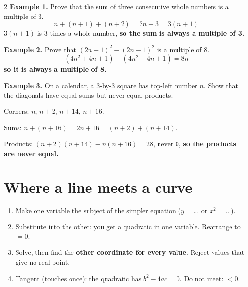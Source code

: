 \documentclass[11pt]{article}
\begin{document}
\begin{multicols}{2}
\textbf{Example 1.} Prove that the sum of three consecutive whole numbers is a multiple of 3.
\[ n + (n+1) + (n+2) = 3n + 3 = 3(n+1) \]
$3(n+1)$ is 3 times a whole number, \textbf{so the sum is always a multiple of 3.} 

\textbf{Example 2.} Prove that $(2n+1)^{2} - (2n-1)^{2}$ is a multiple of 8.
\[ (4n^{2}+4n+1) - (4n^{2}-4n+1) = 8n \]
\textbf{so it is always a multiple of 8.} 
\columnbreak

\textbf{Example 3.} On a calendar, a 3-by-3 square has top-left number $n$. Show that the diagonals have equal sums but never equal products.\par
\par{}\par\smallskip
Corners: $n$, $n+2$, $n+14$, $n+16$.\par
Sums: $n + (n+16) = 2n + 16 = (n+2) + (n+14)$.\par
Products: $(n+2)(n+14) - n(n+16) = 28$, never 0, \textbf{so the products are never equal.} 
\end{multicols}

\section{Where a line meets a curve}\label{h4:simul}
\begin{keybox}[title={Write it in this order}]
\begin{enumerate}
\item Make one variable the subject of the simpler equation ($y = \ldots$ or $x^{2} = \ldots$).
\item Substitute into the other: you get a quadratic in one variable. Rearrange to $= 0$.
\item Solve, then find the \textbf{other coordinate for every value}. Reject values that give no real point.
\item Tangent (touches once): the quadratic has $b^{2} - 4ac = 0$. Do not meet: $< 0$.
\end{enumerate}
\end{keybox}
\end{document}
